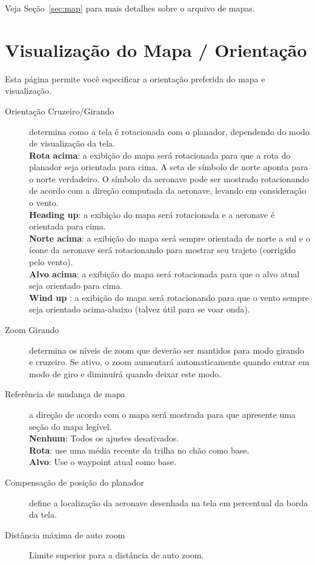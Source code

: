 Veja Seção~\ref{sec:map} para mais detalhes sobre o arquivo de mapas.  


\section{Visualização do Mapa / Orientação}\label{sec:map-projection}

Esta página permite você especificar a orientação preferida do mapa e visualização.

\begin{description}
\item[Orientação Cruzeiro/Girando]  \label{conf:orientation} determina como a tela é rotacionada com o planador, dependendo do modo de visualização da tela.  \\
  {\bf Rota acima}: a exibição do mapa será rotacionada para que a rota do planador seja orientada para cima.  A seta de símbolo de norte aponta para o norte verdadeiro.  O símbolo da aeronave pode ser mostrado rotacionando de acordo com a direção computada da aeronave, levando em consideração o vento. \\
  {\bf Heading up}: a exibição do mapa será rotacionada e a aeronave é orientada para cima. \\
  {\bf Norte acima}: a exibição do mapa será sempre orientada de norte a sul e o ícone da aeronave será rotacionando para mostrar seu trajeto (corrigido pelo vento). \\
  {\bf Alvo acima}: a exibição do mapa será rotacionada para que o alvo atual seja orientado para cima. \\
  {\bf Wind up} :  a exibição do mapa será rotacionando para que o vento sempre seja orientado acima-abaixo (talvez útil para se voar onda).
\item[Zoom Girando]  \label{conf:circlingzoom} determina os níveis de zoom que deverão ser mantidos para modo girando e cruzeiro.  Se ativo, o zoom aumentará automaticamente quando entrar em modo de giro e diminuirá quando deixar este modo.
\item[Referência de mudança de mapa]  a direção de acordo com o mapa será mostrada para que apresente uma seção do mapa legível. \\
  {\bf Nenhum}: Todos os ajustes desativados. \\
  {\bf Rota}: use uma média recente da trilha no chão como base. \\
  {\bf Alvo}: Use o waypoint atual como base.
\item[Compensação de posição do planador]  \label{conf:gliderposition} define a localização da aeronave desenhada na tela em percentual da borda da tela.
\item[Distância máxima de auto zoom]  Limite superior para a distância de auto zoom.
\end{description}



